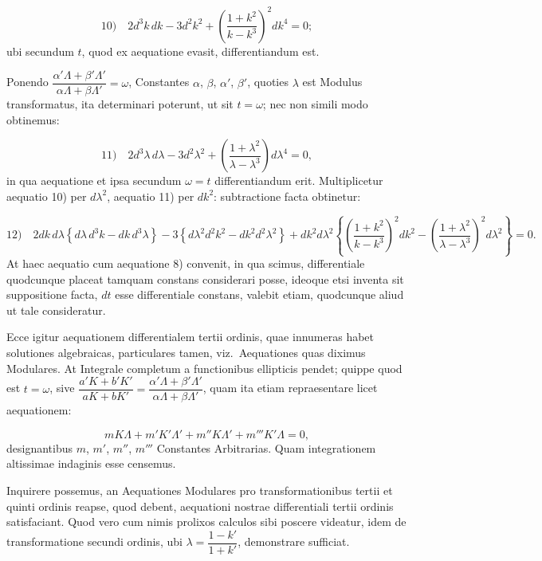 \documentclass{article}
\begin{document}
\[
\text{10)}\quad2d^{3}k\,dk-3d^{2}k^{2}+\left(\frac{1+k^{2}}{k-k^{3}}\right)^{2}dk^{4}=0;
\]
ubi secundum $t$, quod ex aequatione evasit, differentiandum est.

Ponendo $\dfrac{\alpha'\Lambda+\beta'\Lambda'}{\alpha\Lambda+\beta\Lambda'}=\omega$, Constantes $\alpha$, $\beta$, $\alpha'$, $\beta'$, quoties $\lambda$ est Modulus transformatus, ita determinari poterunt, ut sit $t=\omega$; nec non simili modo obtinemus:

\[
\text{11)}\quad2d^{3}\lambda\,d\lambda-3d^{2}\lambda^{2}+\left(\frac{1+\lambda^{2}}{\lambda-\lambda^{3}}\right)d\lambda^{4}=0,
\]
in qua aequatione et ipsa secundum $\omega=t$ differentiandum erit. Multiplicetur aequatio 10) per $d\lambda^{2}$, aequatio 11) per $dk^{2}$: subtractione facta obtinetur:

\[
\text{12)}\quad2dk\,d\lambda\left\{d\lambda\,d^{3}k-dk\,d^{3}\lambda\right\}-3\left\{d\lambda^{2}d^{2}k^{2}-dk^{2}d^{2}\lambda^{2}\right\}+dk^{2}d\lambda^{2}\left\{\left(\frac{1+k^{2}}{k-k^{3}}\right)^{2}dk^{2}-\left(\frac{1+\lambda^{2}}{\lambda-\lambda^{3}}\right)^{2}d\lambda^{2}\right\}=0.
\]
At haec aequatio cum aequatione 8) convenit, in qua scimus, differentiale quodcunque placeat tamquam constans considerari posse, ideoque etsi inventa sit suppositione facta, $dt$ esse differentiale constans, valebit etiam, quodcunque aliud ut tale consideratur.

Ecce igitur aequationem differentialem tertii ordinis, quae innumeras habet solutiones algebraicas, particulares tamen, viz.\ Aequationes quas diximus Modulares. At Integrale completum a functionibus ellipticis pendet; quippe quod est $t=\omega$, sive $\dfrac{a'K+b'K'}{aK+bK'}=\dfrac{\alpha'\Lambda+\beta'\Lambda'}{\alpha\Lambda+\beta\Lambda'}$, quam ita etiam repraesentare licet aequationem:

\[
mK\Lambda+m'K'\Lambda'+m''K\Lambda'+m'''K'\Lambda=0,
\]
designantibus $m$, $m'$, $m''$, $m'''$ Constantes Arbitrarias. Quam integrationem altissimae indaginis esse censemus.


Inquirere possemus, an Aequationes Modulares pro transformationibus tertii et quinti ordinis reapse, quod debent, aequationi nostrae differentiali tertii ordinis satisfaciant. Quod vero cum nimis prolixos calculos sibi poscere videatur, idem de transformatione secundi ordinis, ubi $\lambda=\dfrac{1-k'}{1+k'}$, demonstrare sufficiat.
\end{document}
